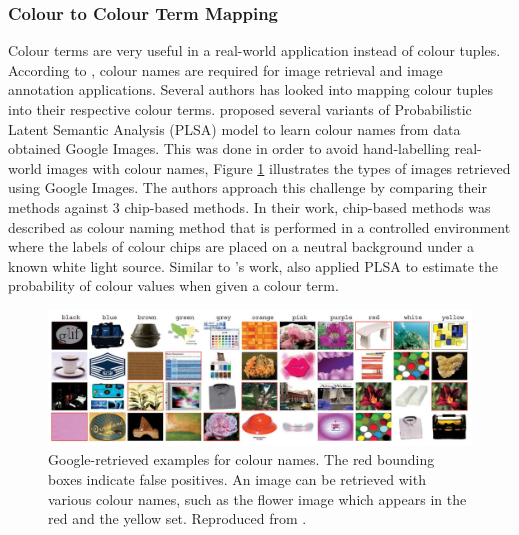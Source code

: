 \subsubsection{Colour to Colour Term Mapping}

Colour terms are very useful in a real-world application instead of colour tuples. According to \cite{van2009learning}, colour names are required for image retrieval and image annotation applications. 
Several authors has looked into mapping colour tuples into their respective colour terms.  proposed several variants of Probabilistic Latent Semantic Analysis (PLSA) model to learn colour names from data obtained Google Images. 
This was done in order to avoid hand-labelling real-world images with colour names, Figure \ref{fig:van20091} illustrates the types of images retrieved using Google Images. The authors approach this challenge by comparing their methods against 3 chip-based methods. 
In their work, chip-based methods was described as colour naming method that is performed in a controlled environment where the labels of colour chips are placed on a neutral background under a known white light source. 
Similar to 's work,  also applied PLSA to estimate the probability of colour values when given a colour term.

\begin{figure}[hbt!]\centering
\includegraphics[width=1\textwidth]{image/lit/van20091.PNG}
\caption[Google-retrieved examples for colour names. The red bounding boxes indicate false positives. An image can be retrieved with various colour names, such as the flower image which appears in the red and the yellow set.]{Google-retrieved examples for colour names. The red bounding boxes indicate false positives. An image can be retrieved with various colour names, such as the flower image which appears in the red and the yellow set.  Reproduced from .}
\label{fig:van20091}
\end{figure}

